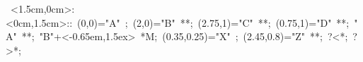
%

\hbox{
\xy    <1.5cm,0cm>:<0cm,1.5cm>::
       (0,0)="A" ; (2,0)="B" **\dir{-};
       (2.75,1)="C" **\dir{-}; (0.75,1)="D" **\dir{-}; "A" **\dir{-};
       "B"+<-0.65em,1.5ex> *{M};
       (0.35,0.25)="X" ; (2.45,0.8)="Z" **\dir{-}; ?<*\dir{<}; 
       ?>*\dir{>};
       \endxy}
	   
%

